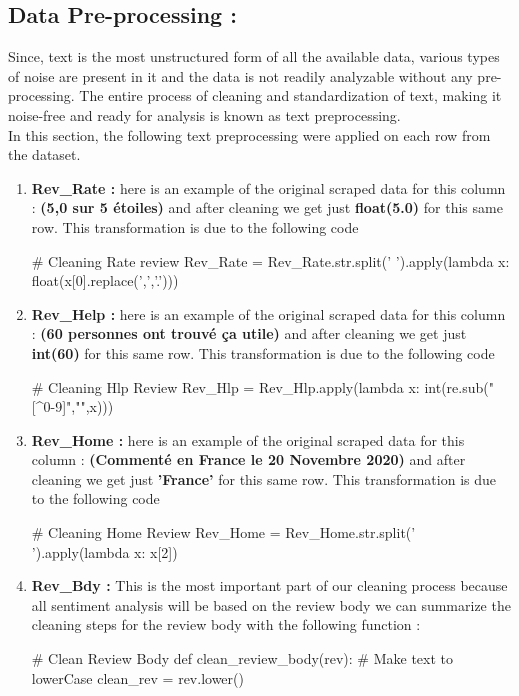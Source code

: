 \documentclass{article}
\begin{document}
\subsection{ Data Pre-processing : }
Since, text is the most unstructured form of all the available data, various types of noise are present in it and the data is not readily analyzable without any pre-processing. The entire process of cleaning and standardization of text, making it noise-free and ready for analysis is known as text preprocessing.\\
In this section, the following text preprocessing were applied on each row from the dataset.
\begin{enumerate}
    \item \textbf{Rev\_Rate :} here is an example of the original scraped data for this column : \textbf{(5,0 sur 5 étoiles)} and after cleaning we get just \textbf{float(5.0)} for this same row. This transformation is due to the following code
\begin{code}
    # Cleaning Rate review
    Rev_Rate = Rev_Rate.str.split(' ').apply(lambda x: float(x[0].replace(',','.')))
\end{code}
    \item \textbf{Rev\_Help :} here is an example of the original scraped data for this column : \textbf{(60 personnes ont trouvé ça utile)} and after cleaning we get just \textbf{int(60)} for this same row. This transformation is due to the following code
\begin{code}
    # Cleaning Hlp Review
    Rev_Hlp = Rev_Hlp.apply(lambda x: int(re.sub("[^0-9]","",x)))
\end{code}
    \item \textbf{Rev\_Home :} here is an example of the original scraped data for this column : \textbf{(Commenté en France le 20 Novembre 2020)} and after cleaning we get just \textbf{'France'} for this same row. This transformation is due to the following code
\begin{code}
    # Cleaning Home Review
    Rev_Home = Rev_Home.str.split(' ').apply(lambda x: x[2])
\end{code}
    \item \textbf{Rev\_Bdy :} This is the most important part of our cleaning process because all sentiment analysis will be based on the review body we can summarize the cleaning steps for the review body with the following function :
\begin{code}
# Clean Review Body
def clean_review_body(rev):
  # Make text to lowerCase
  clean_rev = rev.lower()

\end{code}
\end{enumerate}
\end{document}
